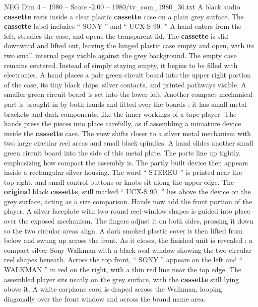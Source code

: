 \begin{textsample}{NEG Dim 4 – 1980 – Score -2.00 – 1980/tv\_com\_1980\_36.txt}  \label{ex:f4_neg_052}
A black audio \textbf{cassette} rests inside a clear plastic \textbf{cassette} case on a plain grey surface.
The \textbf{cassette} label includes “ SONY ” and “ UCX-S 90. ” A hand enters from the left, steadies the case, and opens the transparent lid.
The \textbf{cassette} is slid downward and lifted out, leaving the hinged plastic case empty and open, with its two small internal pegs visible against the grey background.
The empty case remains centered.
Instead of simply staying empty, it begins to be filled with electronics.
A hand places a pale green circuit board into the upper right portion of the case, its tiny black chips, silver contacts, and printed pathways visible.
A smaller green circuit board is set into the lower left.
Another compact mechanical part is brought in by both hands and fitted over the boards ; it has small metal brackets and dark components, like the inner workings of a tape player.
The hands press the pieces into place carefully, as if assembling a miniature device inside the \textbf{cassette} case.
The view shifts closer to a silver metal mechanism with two large circular reel areas and small black spindles.
A hand slides another small green circuit board into the side of this metal plate.
The parts line up tightly, emphasizing how compact the assembly is.
The partly built device then appears inside a rectangular silver housing.
The word “ STEREO ” is printed near the top right, and small control buttons or knobs sit along the upper edge.
The \textbf{original} black \textbf{cassette}, still marked “ UCX-S 90, ” lies above the device on the grey surface, acting as a size comparison.
Hands now add the front portion of the player.
A silver faceplate with two round reel-window shapes is guided into place over the exposed mechanism.
The fingers adjust it on both sides, pressing it down so the two circular areas align.
A dark smoked plastic cover is then lifted from below and swung up across the front.
As it closes, the finished unit is revealed : a compact silver Sony Walkman with a black oval window showing the two circular reel shapes beneath.
Across the top front, “ SONY ” appears on the left and “ WALKMAN ” in red on the right, with a thin red line near the top edge.
The assembled player sits neatly on the grey surface, with the \textbf{cassette} still lying above it.
A white earphone cord is draped across the Walkman, looping diagonally over the front window and across the brand name area.

\end{textsample}
